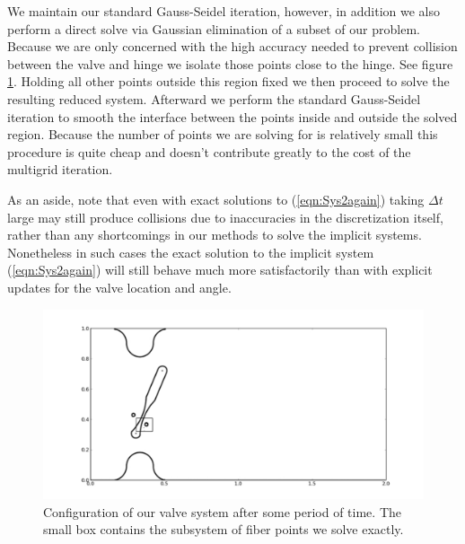 \documentclass[preprint,12pt]{elsarticle}
\begin{document}
We maintain our standard Gauss-Seidel iteration, however, in addition we also perform a direct solve via Gaussian elimination of a subset of our problem. Because we are only concerned with the high accuracy needed to prevent collision between the valve and hinge we isolate those points close to the hinge. See figure \ref{fig:Box}. Holding all other points outside this region fixed we then proceed to solve the resulting reduced system. Afterward we perform the standard Gauss-Seidel iteration to smooth the interface between the points inside and outside the solved region. Because the number of points we are solving for is relatively small this procedure is quite cheap and doesn't contribute greatly to the cost of the multigrid iteration.
 
As an aside, note that even with exact solutions to (\ref{eqn:Sys2again}) taking $\Delta t$ large may still produce collisions due to inaccuracies in the discretization itself, rather than any shortcomings in our methods to solve the implicit systems. Nonetheless in such cases the exact solution to the implicit system (\ref{eqn:Sys2again}) will still behave much more satisfactorily than with explicit updates for the valve location and angle.

\begin{figure}[!b]
  \begin{center}
    \includegraphics[bb=.5in .25in 7.35in 3.75in,width=5.25in,clip]{Box.pdf}
  \end{center}

  \caption{\small Configuration of our valve system after some period of time. The small box contains the subsystem of fiber points we solve exactly.}
  \label{fig:Box}
\end{figure}
\end{document}
